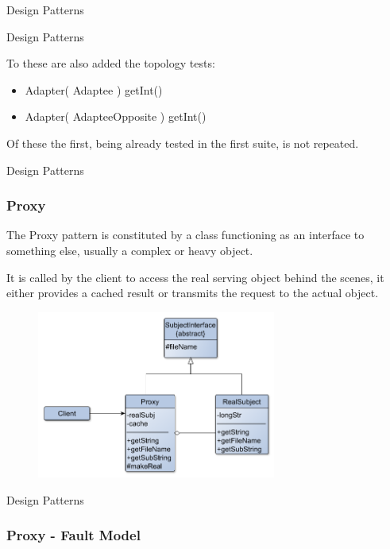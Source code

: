 \documentclass{beamer}
\begin{document}
\begin{section}{Design Patterns}
\begin{subsection}{Design Patterns}
\begin{frame}
\begin{itemize}
		\end{itemize}
		To these are also added the topology tests:
		\begin{itemize}
			\item Adapter( Adaptee ) getInt() 
			\item Adapter( AdapteeOpposite ) getInt()
		\end{itemize}	
		Of these the first, being already tested in the first suite, is not repeated.
		
			
		\end{frame}
	\end{subsection}



	\begin{subsection}{Design Patterns}
		\begin{frame}
			\frametitle{Proxy}
The Proxy pattern is constituted by a class  functioning as an interface to something else, usually a complex or heavy object.

{\small It is called by the client to access the real serving object behind the scenes, it either provides a cached result or transmits the request to the actual object.
}			
			
\begin{figure}[!h]
	\centering
	\includegraphics[width=0.7\textwidth]{./Proxy/ClassDiagram.png}
	\label{ProclassDiag}
\end{figure} 
			
		\end{frame}
	\end{subsection}


\begin{subsection}{Design Patterns}
	\begin{frame}
		\frametitle{Proxy - Fault Model}
		

\end{frame}
\end{subsection}
\end{section}
\end{document}
